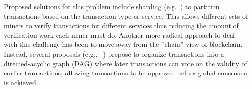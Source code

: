 Proposed solutions for this problem include sharding (e.g.~\cite{CCS:LNZBGS16, FC:GenRenSir17}) to partition transactions based on the transaction type or service.
This allows different sets of miners to verify transactions for different services thus reducing the amount of verification work each miner must do.  Another more radical approach to deal with this challenge has been to move away from the ``chain'' view of blockchain.  Instead, several proposals (e.g., ~\cite{ePrint:SomLewZoh16,eprint:SomZoh18,IOTA}) propose to organize transactions into a directed-acyclic graph (DAG) where later transactions can vote on the validity of earlier transactions, allowing transactions to be approved before global consensus is achieved.
%
%


